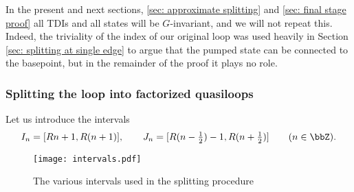 In the present and next sections, \ref{sec: approximate splitting} and \ref{sec: final stage proof} all TDIs and all states will be $G$-invariant, and we will not repeat this.  Indeed, the triviality of the index of our original loop was used heavily in Section \ref{sec: splitting at single edge} to argue that the pumped state can be connected to the basepoint, but in the remainder of the proof it plays no role.  


\subsubsection{Splitting the loop into factorized quasiloops}\label{sec:factorized quasi-loops}

Let us introduce the intervals 
$$
I_n= [Rn+1,R(n+1)],\qquad   J_n= [R(n-\tfrac{1}{2})-1,R(n+\tfrac{1}{2})]\qquad(n\in \bbZ).
$$

\begin{figure}[htb]
	\begin{center}
		\texttt{[image: intervals.pdf]}
		\caption{The various intervals used in the splitting procedure}
		\label{fig: intervals}
	\end{center}
\end{figure}

